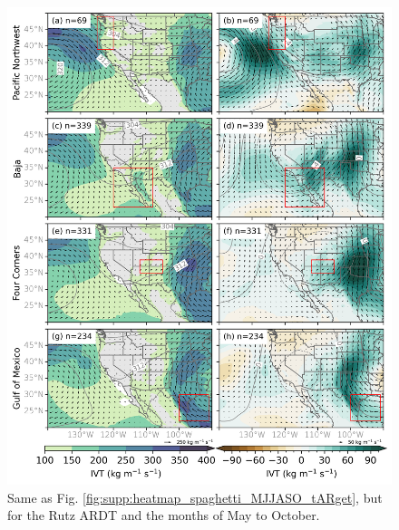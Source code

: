 \documentclass[draft,jgrga]{agutexSI2019}
\begin{document}
\begin{article}
\begin{figure}
\noindent\includegraphics[scale=0.8]{figS6.png}
\caption{Same as Fig. \ref{fig:supp:heatmap_spaghetti_MJJASO_tARget}, but for the Rutz ARDT and the months of May to October.}
\label{fig:supp:heatmap_spaghetti_MJJASO_Rutz}
\end{figure}


\end{article}
\end{document}
